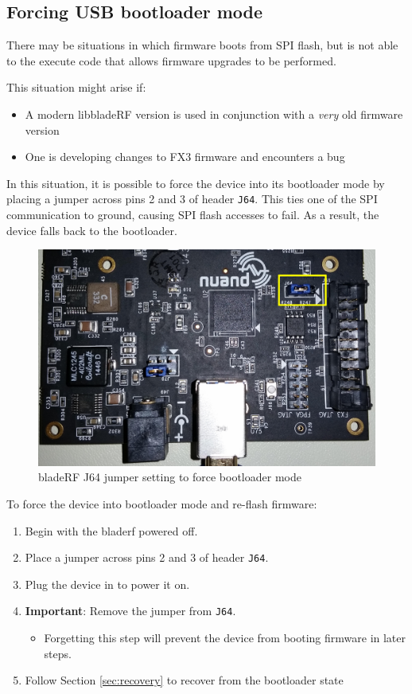 \newpage
\subsection{Forcing USB bootloader mode}

There may be situations in which firmware boots from SPI flash, but is
not able to the execute code that allows firmware upgrades to be performed.

This situation might arise if:
\begin{itemize}
    \item A modern libbladeRF version is used in conjunction with a \textit{very} old firmware version
    \item One is developing changes to FX3 firmware and encounters a bug
\end{itemize}

In this situation, it is possible to force the device into its bootloader mode
by placing a jumper across pins 2 and 3 of header \texttt{J64}. This ties one of the
SPI communication to ground, causing SPI flash accesses to fail. As a result, the
device falls back to the bootloader.

\begin{figure}[h]
  \label{fig:j64-jumpered}
  \centering
  \includegraphics[width=4.5in]{images/bladeRF/j64-jumpered.jpg}
  \caption{bladeRF J64 jumper setting to force bootloader mode}
\end{figure}


To force the device into bootloader mode and re-flash firmware:
\begin{enumerate}
    \item Begin with the bladerf powered off.
    \item Place a jumper across pins 2 and 3 of header \texttt{J64}.
    \item Plug the device in to power it on.
    \item \textbf{Important}: Remove the jumper from \texttt{J64}.
        \begin{itemize}
            \item Forgetting this step will prevent the device from booting firmware in later steps.
        \end{itemize}
    \item Follow Section \ref{sec:recovery} to recover from the bootloader state
\end{enumerate}
